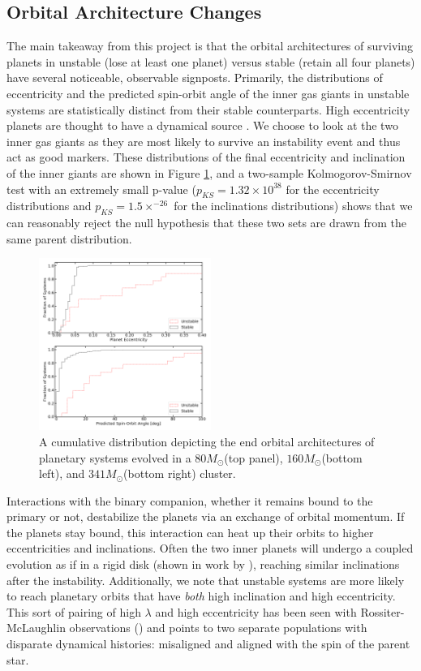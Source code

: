 \documentclass{aastex631}
\begin{document}
\subsection{Orbital Architecture Changes}
The main takeaway from this project is that the orbital architectures of surviving planets in unstable (lose at least one planet)
 versus stable (retain all four planets) have several noticeable, observable signposts. 
 Primarily, the distributions of eccentricity and the predicted spin-orbit angle of the inner gas giants in 
 unstable systems are statistically distinct from their stable counterparts. High eccentricity planets are thought to have a dynamical source \citep{dlfm97,for08}.
  We choose to look at the 
 two inner gas giants as they are most likely to survive an instability event and thus act as good markers.
These distributions of the final eccentricity and inclination of the inner giants are shown in Figure \ref{fig:160_ecc_inc}, 
 and a two-sample Kolmogorov-Smirnov test with an extremely small p-value ($p_{KS} = 1.32\times {10^38}$ for the eccentricity distributions
 and $p_{KS} = 1.5\times ^{-26}$ for the inclinations distributions) shows that we can reasonably reject the null hypothesis that these two sets are drawn 
 from the same parent distribution.
\begin{figure}[h!]
    \centering
    \includegraphics[width=0.5\textwidth]{fig/cumulative_ecc_inc_bigfont80.png}
    
    \caption{A cumulative distribution depicting the end orbital architectures of planetary systems evolved in a $80M_{\odot}$(top panel), $160M_{\odot}$(bottom left), 
    and $341M_{\odot}$(bottom right) cluster.}
    \label{fig:160_ecc_inc}
\end{figure}
Interactions with the binary companion, whether it remains bound to the primary or not, destabilize the planets via an exchange of orbital 
momentum. If the planets stay bound, this interaction can heat up their orbits to higher eccentricities and inclinations. Often the two
inner planets will undergo a coupled evolution as if in a rigid disk (shown in work by \cite{ina97}), reaching similar inclinations after the instability. 
Additionally, we note that unstable systems are more likely to reach planetary orbits that have \textit{both} high inclination and high eccentricity. This 
sort of pairing of high $\lambda$ and high eccentricity has been seen with Rossiter-McLaughlin observations
(\cite{sch10}) and points to two separate populations with disparate dynamical histories: misaligned and aligned with the 
spin of the parent star.
\end{document}
